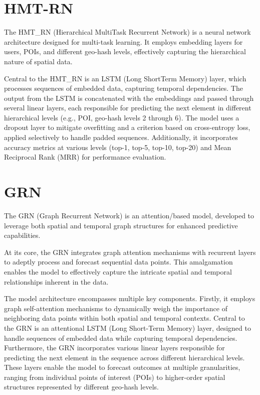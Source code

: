 \documentclass[twocolumn]{article}
\begin{document}
\section{HMT-RN}
The HMT\_RN (Hierarchical Multi\-Task Recurrent Network) is a
neural network architecture designed for multi-task learning. It employs 
embedding layers for users, POIs, and different geo-hash levels,
 effectively capturing the hierarchical nature of spatial data.

Central to the HMT\_RN is an LSTM (Long Short\-Term Memory) layer,
which processes sequences of embedded data, capturing temporal dependencies.
The output from the LSTM is concatenated with the embeddings
and passed through several linear layers, each responsible
for predicting the next element in different hierarchical 
levels (e.g., POI, geo-hash levels 2 through 6). The model 
uses a dropout layer to mitigate overfitting and a
criterion based on cross-entropy loss, applied selectively
to handle padded sequences. Additionally, 
it incorporates accuracy metrics at various 
levels (top-1, top-5, top-10, top-20) and 
Mean Reciprocal Rank (MRR) for performance
evaluation.
\section{GRN}
The GRN (Graph Recurrent Network) is an attention/based model, developed to 
leverage both spatial and temporal graph structures for enhanced predictive
 capabilities.

At its core, the GRN integrates graph attention mechanisms 
with recurrent layers to adeptly process and forecast sequential data points.
 This amalgamation enables the model to effectively capture the intricate 
 spatial and temporal relationships inherent in the data.

The model architecture encompasses multiple key components. Firstly, it employs 
graph self-attention mechanisms to dynamically weigh the importance of 
neighboring data points within both spatial and temporal contexts. 
Central to the GRN is an attentional LSTM (Long Short-Term Memory) layer, 
designed to handle sequences of embedded data while capturing temporal 
dependencies. Furthermore, the GRN incorporates various linear layers 
responsible for predicting the next element in the sequence across 
different hierarchical levels. These layers enable the model to forecast 
outcomes at multiple granularities, ranging from individual points of interest
 (POIs) to higher-order spatial structures represented by different geo-hash levels.
\end{document}
